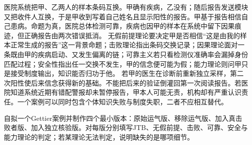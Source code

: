 医院系统把甲、乙两人的样本条码互换。甲确有疾病，乙没有；随后报告发送模块又把收件人互换，于是甲收到写着自己姓名且显示阳性的报告。甲基于报告相信自己患病。命题为真，医院总体检测可靠，疾病也因甲的样本在系统中留下因果痕迹，但正确报告由两次错误抵消。 无假前提理论要决定甲是否相信“这是由我的样本正常生成的报告”这一背景命题；击败理论指出条码交换记录；因果理论面对一条既由甲的疾病启动、又发生偏离的链；可靠主义若只看检测仪准确率会漏掉身份匹配过程；安全性指出任一交换不发生，甲的信念便可能为假；能力理论则问甲只是接受制度输出，知识能否归功于他。 若甲的医生在诊断前重新独立采样，第二次阳性使后来信念获得新的基础。不能把后来的验证倒灌回第一次阅读报告。若医院知道系统近期有错配警报却未暂停报告，甲本人可能无责，机构却有严重认识责任。一个案例可以同时包含个体知识失败与制度失职，二者不应相互替代。

\begin{tcolorbox}[breakable,colback=white,colframe=blue!30!black,title={本章研读任务},fonttitle=\bfseries]
自拟一个Gettier案例并制作四个最小版本：原始运气版、移除运气版、加入真击败者版、加入独立核验版。对每版分别填写JTB、无假前提、击败、可靠、安全与能力理论的判定；若某理论无法判定，说明缺失的是哪项细节。
\end{tcolorbox}
